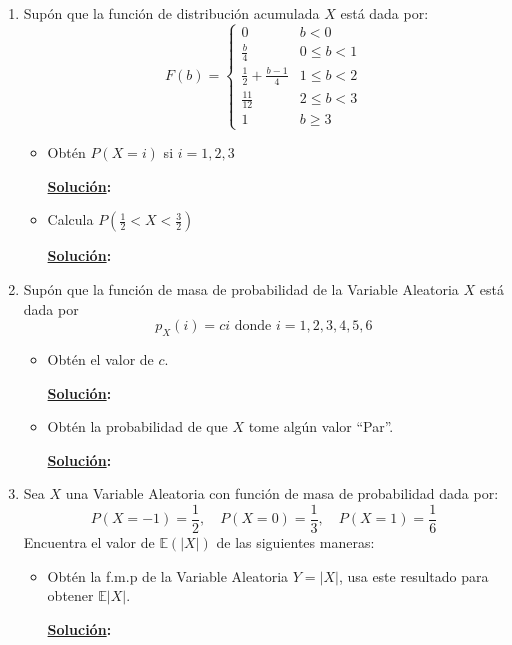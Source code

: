 \documentclass[11pt,letterpaper]{report}
\newcommand{\sol}{\textbf{\underline{Solución}: }} %
\begin{document}
\begin{enumerate}

\item Supón que la función de distribución acumulada $X$ está dada por:
\[
    F(b) =
        \begin{cases}
            0   & b < 0\\
            \frac{b}{4}    & 0 \leq b < 1\\
            \frac{1}{2} + \frac{b-1}{4}    & 1 \leq b < 2\\
            \frac{11}{12}    & 2 \leq b < 3\\
            1   & b \geq 3
        \end{cases}
\]
\begin{itemize}
    \item Obtén $P(X = i)$ si $i=1,2,3$
    
    \sol

    \item Calcula $P(\frac{1}{2} < X < \frac{3}{2})$
    
    \sol
\end{itemize}

\item Supón que la función de masa de probabilidad de la Variable Aleatoria $X$ está dada por
\[
    p_X(i) = ci \text{ donde } i = 1,2,3,4,5,6
\]
\begin{itemize}
    \item Obtén el valor de $c$.
    
    \sol

    
    \item Obtén la probabilidad de que $X$ tome algún valor ``Par''.
    
    \sol
\end{itemize}

\item Sea $X$ una Variable Aleatoria con función de masa de probabilidad dada por:
\[
    P(X=-1)= \frac{1}{2},\quad P(X=0)=\frac{1}{3},\quad P(X=1)=\frac{1}{6}
    \]
    Encuentra el valor de $\mathds{E}(|X|)$ de las siguientes maneras:
    \begin{itemize}
        \item Obtén la f.m.p de la Variable Aleatoria $Y = |X|$, usa este resultado para obtener $\mathds{E}|X|$.
        
        \sol
        

\end{itemize}
\end{enumerate}
\end{document}

